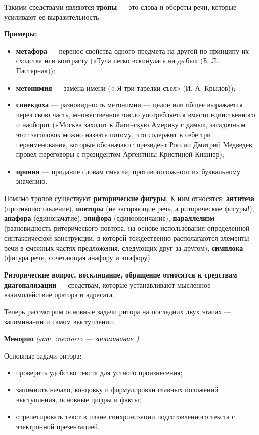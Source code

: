 Такими средствами являются \textbf{тропы} — это слова и обороты речи, которые усиливают ее выразительность.

\textbf{Примеры:}
\begin{itemize}
    \item \textbf{метафора} — перенос свойства одного предмета на другой по принципу их сходства или контрасту («Туча легко вскинулась на дыбы» (Б. Л. Пастернак)); 
    \item \textbf{метонимия} — замена имени (« Я три тарелки съел» (И. А. Крылов));
    \item \textbf{синекдоха} — разновидность метонимии — целое или общее выражается через свою часть, множественное число употребляется вместо единственного и наоборот («Москва заходит в Латинскую Америку с дамы», загадочным этот заголовок можно назвать потому, что содержит в себе три переименования, которые обозначают: президент России Дмитрий Медведев провел переговоры с президентом Аргентины Кристиной Кишнер);
    \item \textbf{ирония} — придание словам смысла, противоположного их буквальному значению.
\end{itemize}

Помимо тропов существуют \textbf{риторические фигуры}. К ним относятся: \textbf{антитеза} (противопоставление), \textbf{повторы} (не засоряющие речь, а риторические фигуры!), \textbf{анафора} (единоначатие), \textbf{эпифора} (единоокончание), \textbf{параллелизм} (разновидность риторического повтора, на основе использования определенной синтаксической конструкции, в которой тождественно располагаются элементы речи в смежных частях предложения, следующих друг за другом), \textbf{симплока} (фигура речи, сочетающая анафору и эпифору). 

\textbf{Риторические вопрос, восклицание, обращение относятся к средствам диагонализации} — средствам, которые устанавливают мысленное взаимодействие оратора и адресата.

Теперь рассмотрим основные задачи ритора на последних двух этапах — запоминании и самом выступлении.

\textbf{Меморио} \textit{(лат. memorio — запоминание )}

Основные задачи ритора:
\begin{itemize}
    \item проверить удобство текста для устного произнесения;
    \item запомнить начало, концовку и формулировки главных положений выступления, основные цифры и факты;
    \item  отрепетировать текст в плане синхронизации подготовленного текста с электронной презентацией.
\end{itemize}

